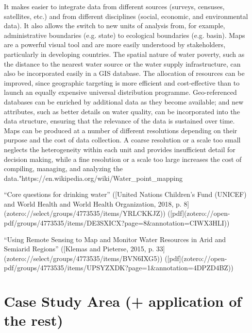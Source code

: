 {It makes easier to integrate data from different sources (surveys, censuses, satellites, etc.) and from different disciplines (social, economic, and environmental data). It also allows the switch to new units of analysis from, for example, administrative boundaries (e.g. state) to ecological boundaries (e.g. basin).
Maps are a powerful visual tool and are more easily understood by stakeholders, particularly in developing countries.
The spatial nature of water poverty, such as the distance to the nearest water source or the water supply infrastructure, can also be incorporated easily in a GIS database.
The allocation of resources can be improved, since geographic targeting is more efficient and cost-effective than to launch an equally expensive universal distribution programme.
Geo-referenced databases can be enriched by additional data as they become available; and new attributes, such as better details on water quality, can be incorporated into the data structure, ensuring that the relevance of the data is sustained over time.
Maps can be produced at a number of different resolutions depending on their purpose and the cost of data collection. A coarse resolution or a scale too small neglects the heterogeneity within each unit and provides insufficient detail for decision making, while a fine resolution or a scale too large increases the cost of compiling, managing, and analyzing the data."https://en.wikipedia.org/wiki/Water_point_mapping

“Core questions for drinking water” ([United Nations Children’s Fund (UNICEF) and World Health and World Health Organization, 2018, p. 8](zotero://select/groups/4773535/items/YRLCKKJZ)) ([pdf](zotero://open-pdf/groups/4773535/items/DE3SXICX?page=8&annotation=CIWX3HLI))

“Using Remote Sensing to Map and Monitor Water Resources in Arid and Semiarid Regions” ([Klemas and Pieterse, 2015, p. 33](zotero://select/groups/4773535/items/BVN6IXG5)) ([pdf](zotero://open-pdf/groups/4773535/items/UPSYZXDK?page=1&annotation=4DPZD4BZ))



\section{Case Study Area (+ application of the rest)}

}
